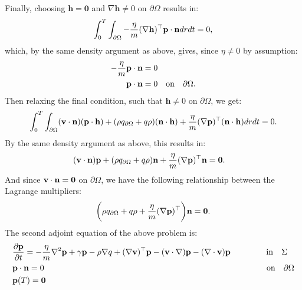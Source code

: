 Finally, choosing $\mathbf{h}=\mathbf{0}$ and $\nabla \mathbf{h}  \neq 0$ on $\partial \Omega$ results in:
\begin{align*}
\int_0^T \int_{\partial \Omega} - \frac{\eta}{m} (\nabla \mathbf{h})^\top \mathbf{p} \cdot \mathbf{n} dr dt = 0,
\end{align*}
which, by the same density argument as above, gives, since $\eta \neq 0$ by assumption:
\begin{align}
\label{CondAdj1}
- \frac{\eta}{m}  \mathbf{p}  \cdot \mathbf{n}&= 0  \notag\\
 \mathbf{p}  \cdot \mathbf{n} &= 0 \quad \text{on} \quad \partial \Omega.
\end{align}
Then relaxing the final condition, such that $\mathbf{h} \neq 0$ on $\partial \Omega$, we get:
\begin{align*}
\int_0^T \int_{\partial\Omega} (\mathbf{v} \cdot \mathbf{n})(\mathbf{p} \cdot \mathbf{h}) +(\rho  {q}_{\partial \Omega} + q \rho)  (\mathbf{n}\cdot \mathbf{h}) +\frac{\eta}{m}  (\nabla \mathbf{p})^\top ( \mathbf{n}\cdot \mathbf{h})dr dt=0.
\end{align*}
By the same density argument as above, this results in:
\begin{align*}
&(\mathbf{v} \cdot \mathbf{n})\mathbf{p}  +(\rho  {q}_{\partial \Omega} + q \rho)\mathbf{n}+\frac{\eta}{m}  (\nabla \mathbf{p})^\top \mathbf{n} =\mathbf{0}.
\end{align*}
And since $\mathbf{v} \cdot \mathbf{n} = \mathbf{0}$ on $\partial \Omega$, we have the following relationship between the Lagrange multipliers:
\begin{align*}
\bigg(\rho  {q}_{\partial \Omega} + q \rho+\frac{\eta}{m}  (\nabla \mathbf{p})^\top \bigg) \mathbf{n} =\mathbf{0}.
\end{align*}
The second adjoint equation of the above problem is:
\begin{align}
\label{eqn:INAdj2}
&\frac{\partial \Adja}{\partial t} =  - \frac{\eta}{m} \nabla^2 \Adja  + \gamma\Adja-\Sta\nabla \Adjb +(\nabla \Stav)^\top\Adja 
- (\Stav \cdot \nabla)\Adja -  (\nabla \cdot \Stav)\Adja     \ \qquad\qquad \text{in} \quad \Sigma\\
&\Adja \cdot \mathbf{n} = 0 \qquad \qquad \qquad \qquad \qquad \qquad \qquad \qquad \qquad \qquad \qquad\qquad \qquad\quad \text{on} \quad \partial \Omega \notag \\
&\Adja(T)=\mathbf{0} \notag
\end{align}
